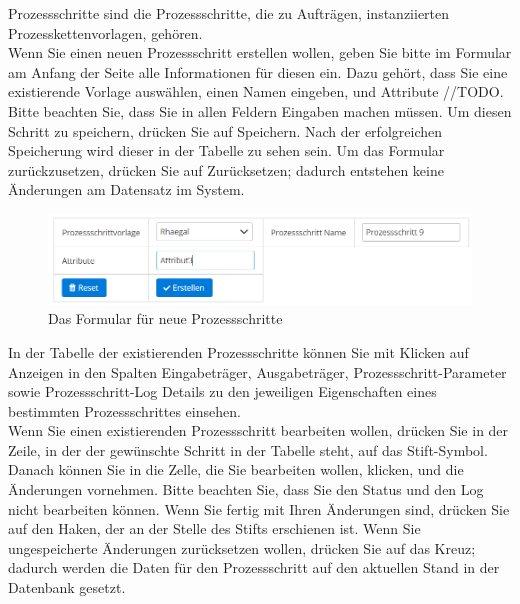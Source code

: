 \documentclass[enabledeprecatedfontcommands,fontsize=12pt,paper=a4,twoside]{scrartcl}
\begin{document}
Prozessschritte sind die Prozessschritte, die zu Aufträgen, instanziierten Prozesskettenvorlagen, gehören. \\

Wenn Sie einen neuen Prozessschritt erstellen wollen, geben Sie bitte im Formular am Anfang der Seite alle Informationen für diesen ein. Dazu gehört, dass Sie eine existierende Vorlage auswählen, einen Namen eingeben, und Attribute //TODO. Bitte beachten Sie, dass Sie in allen Feldern Eingaben machen müssen. Um diesen Schritt zu speichern, drücken Sie auf Speichern. Nach der erfolgreichen Speicherung wird dieser in der Tabelle zu sehen sein. Um das Formular zurückzusetzen, drücken Sie auf Zurücksetzen; dadurch entstehen keine Änderungen am Datensatz im System. \\

\begin{figure}[h!]
\begin{center}
 \includegraphics[width=\textwidth]{screenshots/pk/01prozessschrittformular.png}
  \caption{Das Formular für neue Prozessschritte}
  \label{fig:boat2}
\end{center}
\end{figure}

In der Tabelle der existierenden Prozessschritte können Sie mit Klicken auf Anzeigen in den Spalten Eingabeträger, Ausgabeträger, Prozessschritt-Parameter sowie Prozessschritt-Log Details zu den jeweiligen Eigenschaften eines bestimmten Prozessschrittes einsehen. \\

Wenn Sie einen existierenden Prozessschritt bearbeiten wollen, drücken Sie in der Zeile, in der der gewünschte Schritt in der Tabelle steht, auf das Stift-Symbol. Danach können Sie in die Zelle, die Sie bearbeiten wollen, klicken, und die Änderungen vornehmen. Bitte beachten Sie, dass Sie den Status und den Log nicht bearbeiten können. Wenn Sie fertig mit Ihren Änderungen sind, drücken Sie auf den Haken, der an der Stelle des Stifts erschienen ist. Wenn Sie ungespeicherte Änderungen zurücksetzen wollen, drücken Sie auf das Kreuz; dadurch werden die Daten für den Prozessschritt auf den aktuellen Stand in der Datenbank gesetzt. \\
\end{document}
